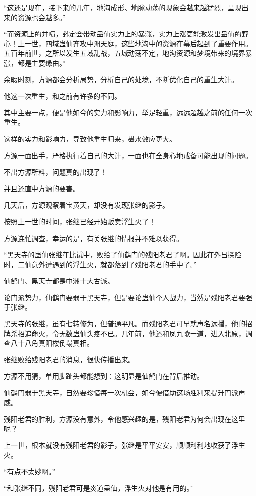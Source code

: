 \begin{this_body}
“这还是现在，接下来的几年，地沟成形、地脉动荡的现象会越来越猛烈，呈现出来的资源也会越多。”

“而资源上的井喷，必定会带动蛊仙实力上的暴涨，实力上涨更能激发出蛊仙的野心！上一世，四域蛊仙齐攻中洲天庭，这些地沟中的资源在幕后起到了重要作用。五百年前世，之所以发生五域乱战，五域动荡不定，地沟资源和梦境带来的境界暴涨，都是主要缘由。”

余暇时刻，方源都会分析局势，分析自己的处境，不断优化自己的重生大计。

他这一次重生，和之前有许多的不同。

其中主要一点，便是他如今的实力和影响力，举足轻重，远远超越之前的任何一次重生。

这样的实力和影响力，导致他重生归来，墨水效应更大。

方源一面出手，严格执行着自己的大计，一面也在全身心地戒备可能出现的问题。

不出方源所料，问题真的出现了！

并且还直中方源的要害。

几天后，方源观察着宝黄天，却没有发现张继的影子。

按照上一世的时间，张继已经开始贩卖浮生火了！

方源连忙调查，幸运的是，有关张继的情报并不难以获得。

“黑天寺的蛊仙张继在比试中，败给了仙鹤门的残阳老君了啊。因此在外出探险时，二仙意外遭遇到的浮生火，就都落到了残阳老君的手中了。”

仙鹤门、黑天寺都是中洲十大古派。

论门派势力，仙鹤门要弱于黑天寺，但是要论蛊仙个人战力，当然是残阳老君要强于张继。

黑天寺的张继，虽有七转修为，但普通平凡。而残阳老君可早就声名远播，他的招牌杀招追命火，令无数蛊仙头疼不已。几年前，他还和凤九歌一道，进入北原，调查八十八角真阳楼倒塌真相。

张继败给残阳老君的消息，很快传播出来。

方源不用猜，单用脚趾头都能想到：这明显是仙鹤门在背后推动。

仙鹤门弱于黑天寺，自然要珍惜每一次机会，如今便借助这场胜利来提升门派声威。

残阳老君的胜利，方源没有意外，令他感兴趣的是，残阳老君为何会出现在这里呢？

上一世，根本就没有残阳老君的影子，张继是平平安安，顺顺利利地收获了浮生火。

“有点不太妙啊。”

“和张继不同，残阳老君可是炎道蛊仙，浮生火对他是有用的。”


\end{this_body}
